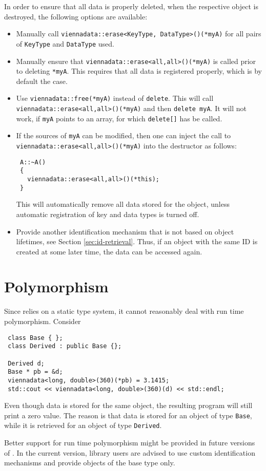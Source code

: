 In order to ensure that all data is properly deleted, when the respective object is destroyed, the following options are available:
\begin{itemize}
 \item Manually call \lstinline|viennadata::erase<KeyType, DataType>()(*myA)| for all pairs of \lstinline|KeyType| and \lstinline|DataType| used.
 \item Manually ensure that \lstinline|viennadata::erase<all,all>()(*myA)| is called prior to deleting \lstinline|*myA|. This requires that all data is registered properly, which is by default the case.
 \item Use \lstinline|viennadata::free(*myA)| instead of \lstinline|delete|. This will call \lstinline|viennadata::erase<all,all>()(*myA)| and then \lstinline|delete myA|. 
 It will not work, if \lstinline|myA| points to an array, for which \lstinline|delete[]| has be called.
 \item If the sources of \lstinline|myA| can be modified, then one can inject the call to \lstinline|viennadata::erase<all,all>()(*myA)| into the destructor as follows:
\begin{lstlisting}
 A::~A()
 {
   viennadata::erase<all,all>()(*this);
 }
\end{lstlisting}
This will automatically remove all data stored for the object, unless automatic registration of key and data types is turned off.
 \item Provide another identification mechanism that is not based on object lifetimes, see Section \ref{sec:id-retrieval}. Thus, if an object with the same ID is created at some later time, the data can be accessed again.
\end{itemize}


\section{Polymorphism}
Since {\ViennaData} relies on a static type system, it cannot reasonably deal with run time polymorphism. Consider
\begin{lstlisting}
 class Base { };
 class Derived : public Base {};

 Derived d;
 Base * pb = &d;
 viennadata<long, double>(360)(*pb) = 3.1415;
 std::cout << viennadata<long, double>(360)(d) << std::endl;
\end{lstlisting}
Even though data is stored for the same object, the resulting program will still print a zero value. 
The reason is that data is stored for an object of type \lstinline|Base|, while it is retrieved for an object of type \lstinline|Derived|.

Better support for run time polymorphism might be provided in future versions of {\ViennaData}. In the current version, library users are advised to use custom identification mechanisms and provide objects of the base type only.


